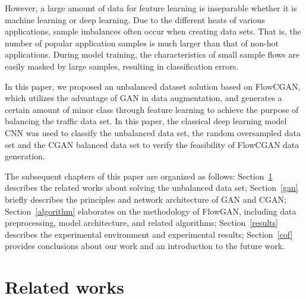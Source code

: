 \documentclass[conference]{IEEEtran}
\begin{document}
However, a large amount of data for feature learning is inseparable whether it is machine learning or deep learning. Due to the different heats of various applications, sample imbalances often occur when creating data sets. That is, the number of popular application samples is much larger than that of non-hot applications. During model training, the characteristics of small sample flows are easily masked by large samples, resulting in classification errors.

In this paper, we proposed an unbalanced dataset solution based on FlowCGAN, which utilizes the advantage of GAN in data augmentation, and generates a certain amount of minor class through feature learning to achieve the purpose of balancing the traffic data set. In this paper, the classical deep learning model CNN was used to classify the unbalanced data set, the random oversampled data set and the CGAN balanced data set to verify the feasibility of FlowCGAN data generation.

The subsequent chapters of this paper are organized as follows: Section~\ref{rw} describes the related works about solving the unbalanced data set; Section~\ref{gan} briefly describes the principles and network architecture of GAN and CGAN; Section~\ref{algorithm} elaborates on the methodology of FlowGAN, including data preprocessing, model architecture, and related algorithms; Section~\ref{results} describes the experimental environment and experimental results; Section~\ref{cof} provides conclusions about our work and an introduction to the future work.
\section{Related works}\label{rw}

\end{document}
